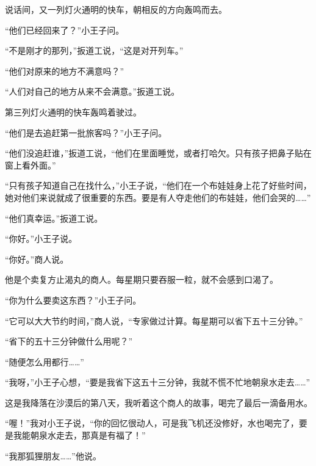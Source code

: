说话间，又一列灯火通明的快车，朝相反的方向轰鸣而去。

“他们已经回来了？”小王子问。

“不是刚才的那列，”扳道工说，“这是对开列车。”

“他们对原来的地方不满意吗？”

“人们对自己的地方从来不会满意。”扳道工说。

第三列灯火通明的快车轰鸣着驶过。

“他们是去追赶第一批旅客吗？”小王子问。

“他们没追赶谁，”扳道工说，“他们在里面睡觉，或者打哈欠。只有孩子把鼻子贴在窗上看外面。”

“只有孩子知道自己在找什么，”小王子说，“他们在一个布娃娃身上花了好些时间，她对他们来说就成了很重要的东西。要是有人夺走他们的布娃娃，他们会哭的\ldots{}\ldots{}”

“他们真幸运。”扳道工说。


\stoptitle

\starttitle[title={23},reference={part0025.html_a026}]

“你好。”小王子说。

“你好。”商人说。

他是个卖复方止渴丸的商人。每星期只要吞服一粒，就不会感到口渴了。

“你为什么要卖这东西？”小王子问。

“它可以大大节约时间，”商人说，“专家做过计算。每星期可以省下五十三分钟。”

“省下的五十三分钟做什么用呢？”

“随便怎么用都行\ldots{}\ldots{}”

“我呀，”小王子心想，“要是我省下这五十三分钟，我就不慌不忙地朝泉水走去\ldots{}\ldots{}”

{\startalignment[center]
 \stopalignment}


\stoptitle

\starttitle[title={24},reference={part0026.html_a027}]

这是我降落在沙漠后的第八天，我听着这个商人的故事，喝完了最后一滴备用水。

“喔！”我对小王子说，“你的回忆很动人，可是我飞机还没修好，水也喝完了，要是我能朝泉水走去，那真是有福了！”

“我那狐狸朋友\ldots{}\ldots{}”他说。

